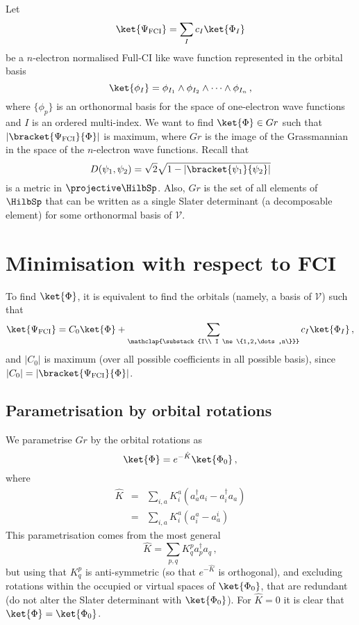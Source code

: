 \documentclass[a4paper,11pt]{article}
\begin{document}
Let
\begin{equation}
  \ket{\Psi_\text{FCI}} = \sum_I c_I \ket{\Phi_I}
\end{equation}
be a $n$-electron normalised Full-CI like wave function represented in the orbital basis
\begin{equation}
  \ket{\phi_I} = \phi_{I_1} \wedge \phi_{I_2} \wedge \dots \wedge \phi_{I_n}\,,
\end{equation}
where $\{\phi_p\}$ is an orthonormal basis for the space of one-electron wave functions and $I$ is an ordered multi-index.
We want to find $\ket{\Phi} \in Gr$ such that $|\bracket{\Psi_\text{FCI}}{\Phi}|$ is maximum, where $Gr$ is the image of the Grassmannian in the space of the $n$-electron wave functions.
Recall that
\begin{equation}
  D(\psi_1, \psi_2) = \sqrt{2}\sqrt{1 - |\bracket{\psi_1}{\psi_2}|}
\end{equation}
is a metric in $\projective \HilbSp$.\cite{}
Also, $Gr$ is the set of all elements of $\HilbSp$ that can be written as a single Slater determinant (a decomposable element) for some orthonormal basis of $\mathcal{V}$.

\newpage
\section{Minimisation with respect to FCI}

To find $\ket{\Phi}$, it is equivalent to find the orbitals (namely, a basis of $\mathcal{V}$) such that 
\begin{equation}
  \ket{\Psi_\text{FCI}} = C_0 \ket{\Phi} +
  \sum_{
    \mathclap{\substack{I\\
        I \ne \{1,2,\dots,n\}}}
      }
    c_I \ket{\Phi_I}\,,
\end{equation}
and $|C_0|$ is maximum (over all possible coefficients in all possible basis), since $|C_0| = |\bracket{\Psi_\text{FCI}}{\Phi}|$.

\subsection{Parametrisation by orbital rotations}
We parametrise $Gr$ by the orbital rotations as\cite{}
\begin{equation}
  \ket{\Phi} = e^{-\hat{K}} \ket{\Phi_0}\,,
\end{equation}
where
\begin{eqnarray}
  \hat{K} &=& \sum_{i,a} K_i^a(a_a^\dagger a_i - a_i^\dagger a_a)\\
          &=& \sum_{i,a} K_i^a(a_i^a - a_a^i)\,
\end{eqnarray}
This parametrisation comes from the most general 
\begin{equation}
  \hat{K} = \sum_{p,q} K_q^pa_p^\dagger a_q\,,
\end{equation}
but using that $K_q^p$ is anti-symmetric (so that $e^{-\hat{K}}$ is orthogonal), and excluding rotations within the occupied or virtual spaces of $\ket{\Phi_0}$, that are redundant (do not alter the Slater determinant with $\ket{\Phi_0}$).
For $\hat{K} = 0$ it is clear that $\ket{\Phi} = \ket{\Phi_0}$.
\end{document}
